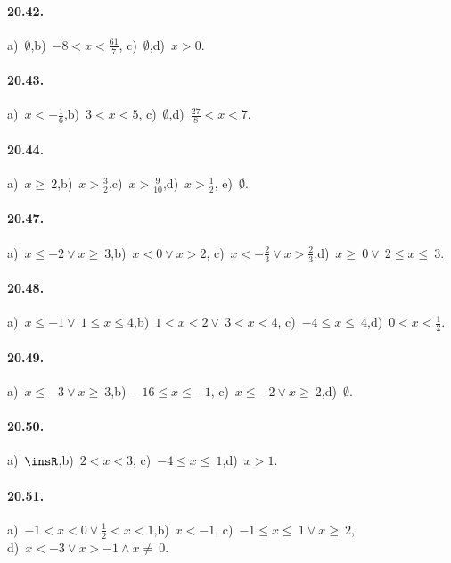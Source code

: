 \paragraph{20.42.} a)~$\emptyset$,\quad b)~$-8<x<\frac{61}{7}$,
\quad c)~$\emptyset$,\quad d)~$x>0$.

\paragraph{20.43.} a)~$x<-{\frac{1}{6}}$,\quad b)~$3<x<5$,
\quad c)~$\emptyset$,\quad d)~${\frac{27}{8}}<x<7$.

\paragraph{20.44.} a)~$x\ge~2$,\quad b)~$x>\frac{3}{2}$,\quad c)~$x>\frac{9}{10}$,\quad d)~$x>\frac{1}{2}$, \quad e)~$\emptyset$.

\paragraph{20.47.} a)~$x\le -2\vee x\ge~3$,\quad b)~$x<0\vee x>2$,\quad
c)~$x<-{\frac{2}{3}}\vee x>\frac{2}{3}$,\quad d)~$x\ge~0\vee~2\le x\le~3$.

\paragraph{20.48.} a)~$x\le -1\vee~1\le x\le4$,\quad b)~$1<x<2\vee~3<x<4$,\quad
c)~$-4\le x\le~4$,\quad d)~$0<x<\frac{1}{2}$.

\paragraph{20.49.} a)~$x\le -3\vee x\ge~3$,\quad b)~$-16\le x\le -1$,\quad
c)~$x\le -2\vee x\ge~2$,\quad d)~$\emptyset $.

\paragraph{20.50.} a)~$\insR$,\quad b)~$2<x<3$,\quad
c)~$-4\le x\le~1$,\quad d)~$x>1$.

\paragraph{20.51.} a)~$-1<x<0\vee \frac{1}{2}<x<1$,\quad b)~$x<-1$,\quad
c)~$-1\le x\le~1\vee x\ge~2$,\quad \protect\\ d)~$x<-3\vee x>-1\wedge x\neq~0$.

